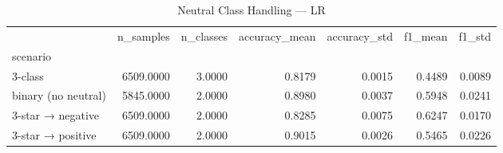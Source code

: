 \begin{table}
\caption{Neutral Class Handling — LR}
\begin{tabular}{lrrrrrr}
\toprule
 & n_samples & n_classes & accuracy_mean & accuracy_std & f1_mean & f1_std \\
scenario &  &  &  &  &  &  \\
\midrule
3-class & 6509.0000 & 3.0000 & 0.8179 & 0.0015 & 0.4489 & 0.0089 \\
binary (no neutral) & 5845.0000 & 2.0000 & 0.8980 & 0.0037 & 0.5948 & 0.0241 \\
3-star → negative & 6509.0000 & 2.0000 & 0.8285 & 0.0075 & 0.6247 & 0.0170 \\
3-star → positive & 6509.0000 & 2.0000 & 0.9015 & 0.0026 & 0.5465 & 0.0226 \\
\bottomrule
\end{tabular}
\end{table}
